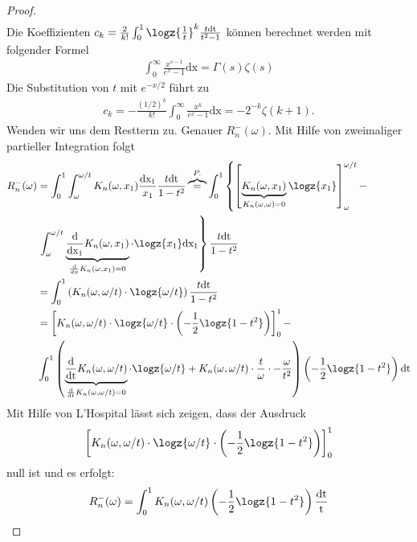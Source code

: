 \begin{satz}
\begin{proof}
\begin{align}
	\end{align}
	Die Koeffizienten $c_k = \frac{2}{k!} \int_0^1 \logz{\frac{1}{t}}^k \frac{t \mathrm{dt}}{t^2-1}$ können berechnet werden mit folgender Formel
	\begin{align}
		\int_0^{\infty} \frac{x^{s-1}}{e^x-1}\mathrm{dx} = \Gamma(s) \zeta(s) 
	\end{align}
	Die Substitution von $t$ mit $e^{-x/2}$ führt zu
	\begin{align}
		c_k = -\frac{(1/2)^k}{k!} \int_0^{\infty} \frac{x^k}{e^x-1} \mathrm{dx} = - 2^{-k} \zeta(k+1) \text{.} 
	\end{align}
	Wenden wir uns dem Restterm zu. Genauer $R_n^-(\omega)$. Mit Hilfe von zweimaliger partieller Integration folgt
	\begin{align}
		R_n^-(\omega) &= \int_0^1 \int_{\omega}^{\omega/t} K_n(\omega, x_1) \frac{\mathrm{dx_1}}{x_1} \frac{t \mathrm{dt}}{1-t^2} \overbrace{=}^{P.} \int_0^1 \left\{ \left[ \underbrace{K_n(\omega, x_1)}_{K_n(\omega, \omega)=0} \logz{x_1} \right]_{\omega}^{\omega/t} - \right. \\
		&\left. \int_{\omega}^{\omega/t} \underbrace{\frac{\mathrm{d}}{\mathrm{dx_1}}K_n(\omega, x_1)}_{\frac{\mathrm{d}}{dx}K_n(\omega, x_1) = 0} \cdot \logz{x_1} \mathrm{dx_1} \right\} \frac{t \mathrm{dt}}{1-t^2}\\
		&= \int_{0}^{1} \left(K_n(\omega, \omega/t) \cdot \logz{\omega/t}\right)  \frac{t \mathrm{dt}}{1-t^2}\\
		&= \left[K_n(\omega, \omega/t) \cdot \logz{\omega/t} \cdot \left(- \frac{1}{2} \logz{1-t^2}\right)\right]^1_0 - \\
		&\int_0^1 \left(\underbrace{\frac{\mathrm{d}}{\mathrm{dt}}K_n(\omega, \omega/t)}_{\frac{\mathrm{d}}{\mathrm{dt}}K_n(\omega, \omega/t) = 0} \cdot \logz{\omega/t} + K_n(\omega, \omega/t) \cdot \frac{t}{\omega} \cdot - \frac{\omega}{t^2}\right) \left(- \frac{1}{2} \logz{1-t^2}\right) \mathrm{dt}\\
	\end{align}
		Mit Hilfe von L'Hospital lässt sich zeigen, dass der Ausdruck
		\begin{align}
			\left[K_n(\omega, \omega/t) \cdot \logz{\omega/t} \cdot \left(-\frac{1}{2} \logz{1-t^2}\right)\right]^1_0
		\end{align}
		null ist und es erfolgt:
		\begin{align}
			R_n^-(\omega) =\int_0^1 K_n(\omega, \omega/t) \left(-\frac{1}{2} \logz{1-t^2}\right) \frac{\mathrm{dt}}{\mathrm{t}}\\
		\end{align}

\end{proof}
\end{satz}
